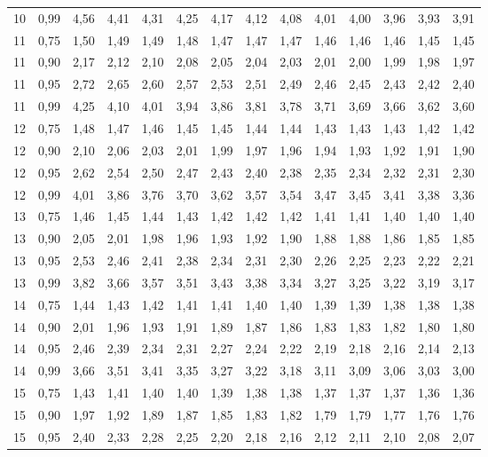 \documentclass[
]{article}
\begin{document}
\begin{landscape}
\begin{longtable}[t]{cccccccccccccc}
10 & 0,99 & 4,56 & 4,41 & 4,31 & 4,25 & 4,17 & 4,12 & 4,08 & 4,01 & 4,00 & 3,96 & 3,93 & 3,91\\
11 & 0,75 & 1,50 & 1,49 & 1,49 & 1,48 & 1,47 & 1,47 & 1,47 & 1,46 & 1,46 & 1,46 & 1,45 & 1,45\\
11 & 0,90 & 2,17 & 2,12 & 2,10 & 2,08 & 2,05 & 2,04 & 2,03 & 2,01 & 2,00 & 1,99 & 1,98 & 1,97\\
11 & 0,95 & 2,72 & 2,65 & 2,60 & 2,57 & 2,53 & 2,51 & 2,49 & 2,46 & 2,45 & 2,43 & 2,42 & 2,40\\
11 & 0,99 & 4,25 & 4,10 & 4,01 & 3,94 & 3,86 & 3,81 & 3,78 & 3,71 & 3,69 & 3,66 & 3,62 & 3,60\\
12 & 0,75 & 1,48 & 1,47 & 1,46 & 1,45 & 1,45 & 1,44 & 1,44 & 1,43 & 1,43 & 1,43 & 1,42 & 1,42\\
12 & 0,90 & 2,10 & 2,06 & 2,03 & 2,01 & 1,99 & 1,97 & 1,96 & 1,94 & 1,93 & 1,92 & 1,91 & 1,90\\
12 & 0,95 & 2,62 & 2,54 & 2,50 & 2,47 & 2,43 & 2,40 & 2,38 & 2,35 & 2,34 & 2,32 & 2,31 & 2,30\\
12 & 0,99 & 4,01 & 3,86 & 3,76 & 3,70 & 3,62 & 3,57 & 3,54 & 3,47 & 3,45 & 3,41 & 3,38 & 3,36\\
13 & 0,75 & 1,46 & 1,45 & 1,44 & 1,43 & 1,42 & 1,42 & 1,42 & 1,41 & 1,41 & 1,40 & 1,40 & 1,40\\
13 & 0,90 & 2,05 & 2,01 & 1,98 & 1,96 & 1,93 & 1,92 & 1,90 & 1,88 & 1,88 & 1,86 & 1,85 & 1,85\\
13 & 0,95 & 2,53 & 2,46 & 2,41 & 2,38 & 2,34 & 2,31 & 2,30 & 2,26 & 2,25 & 2,23 & 2,22 & 2,21\\
13 & 0,99 & 3,82 & 3,66 & 3,57 & 3,51 & 3,43 & 3,38 & 3,34 & 3,27 & 3,25 & 3,22 & 3,19 & 3,17\\
14 & 0,75 & 1,44 & 1,43 & 1,42 & 1,41 & 1,41 & 1,40 & 1,40 & 1,39 & 1,39 & 1,38 & 1,38 & 1,38\\
14 & 0,90 & 2,01 & 1,96 & 1,93 & 1,91 & 1,89 & 1,87 & 1,86 & 1,83 & 1,83 & 1,82 & 1,80 & 1,80\\
14 & 0,95 & 2,46 & 2,39 & 2,34 & 2,31 & 2,27 & 2,24 & 2,22 & 2,19 & 2,18 & 2,16 & 2,14 & 2,13\\
14 & 0,99 & 3,66 & 3,51 & 3,41 & 3,35 & 3,27 & 3,22 & 3,18 & 3,11 & 3,09 & 3,06 & 3,03 & 3,00\\
15 & 0,75 & 1,43 & 1,41 & 1,40 & 1,40 & 1,39 & 1,38 & 1,38 & 1,37 & 1,37 & 1,37 & 1,36 & 1,36\\
15 & 0,90 & 1,97 & 1,92 & 1,89 & 1,87 & 1,85 & 1,83 & 1,82 & 1,79 & 1,79 & 1,77 & 1,76 & 1,76\\
15 & 0,95 & 2,40 & 2,33 & 2,28 & 2,25 & 2,20 & 2,18 & 2,16 & 2,12 & 2,11 & 2,10 & 2,08 & 2,07\\

\end{longtable}
\end{landscape}
\end{document}
